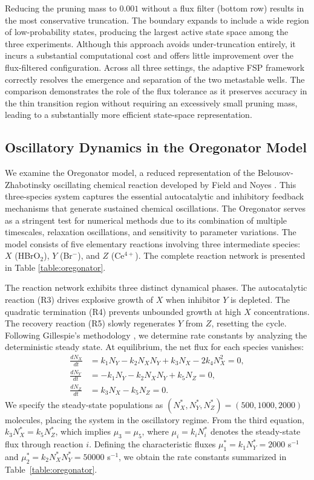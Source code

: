\documentclass[onefignum,onetabnum]{siamart171218}
\begin{document}
Reducing the pruning mass to \(0.001\) without a flux filter (bottom row) results in the most conservative truncation.  
The boundary expands to include a wide region of low-probability states, producing the largest active state space among the three experiments.  
Although this approach avoids under-truncation entirely, it incurs a substantial computational cost and offers little improvement over the flux-filtered configuration. Across all three settings, the adaptive FSP framework correctly resolves the emergence and separation of the two metastable wells. The comparison demonstrates the role of the flux tolerance as it preserves accuracy in the thin transition region without requiring an excessively small pruning mass, leading to a substantially more efficient state-space representation.  


\subsection{Oscillatory Dynamics in the Oregonator Model}

We examine the Oregonator model, a reduced representation of the Belousov-Zhabotinsky oscillating chemical reaction developed by Field and Noyes \cite{field_noyes}. This three-species system captures the essential autocatalytic and inhibitory feedback mechanisms that generate sustained chemical oscillations. The Oregonator serves as a stringent test for numerical methods due to its combination of multiple timescales, relaxation oscillations, and sensitivity to parameter variations. The model consists of five elementary reactions involving three intermediate species: $X$ (HBrO$_2$), $Y$ (Br$^-$), and $Z$ (Ce$^{4+}$). The complete reaction network is presented in Table \ref{table:oregonator}. 

The reaction network exhibits three distinct dynamical phases. The autocatalytic reaction (R3) drives explosive growth of $X$ when inhibitor $Y$ is depleted. The quadratic termination (R4) prevents unbounded growth at high $X$ concentrations. The recovery reaction (R5) slowly regenerates $Y$ from $Z$, resetting the cycle. Following Gillespie's methodology \cite{Gillespie1977}, we determine rate constants by analyzing the deterministic steady state. At equilibrium, the net flux for each species vanishes:
\begin{align}
\frac{dN_X}{dt} &= k_1 N_Y - k_2 N_X N_Y + k_3 N_X - 2k_4 N_X^2 = 0, \\
\frac{dN_Y}{dt} &= -k_1 N_Y - k_2 N_X N_Y + k_5 N_Z = 0, \\
\frac{dN_Z}{dt} &= k_3 N_X - k_5 N_Z = 0.
\end{align}
We specify the steady-state populations as $(N_X^*, N_Y^*, N_Z^*) = (500, 1000, 2000)$ molecules, placing the system in the oscillatory regime. From the third equation, $k_3 N_X^* = k_5 N_Z^*$, which implies $\mu_3 = \mu_5$, where $\mu_i = k_i N_i^*$ denotes the steady-state flux through reaction $i$. Defining the characteristic fluxes $\mu_1^* = k_1 N_Y^* = 2000$ s$^{-1}$ and $\mu_2^* = k_2 N_X^* N_Y^* = 50000$ s$^{-1}$, we obtain the rate constants summarized in Table~\ref{table:oregonator}.
\end{document}
